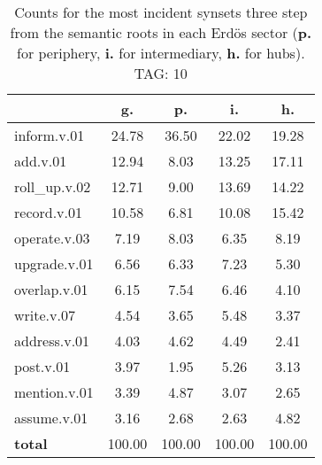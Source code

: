 \begin{table}[h!]
\begin{center}
\begin{tabular}{| l | c | c | c | c |}\hline
 & g. & p. & i. & h. \\\hline
inform.v.01 & 24.78  & 36.50  & 22.02  & 19.28 \\\hline
add.v.01 & 12.94  & 8.03  & 13.25  & 17.11 \\\hline
roll\_up.v.02 & 12.71  & 9.00  & 13.69  & 14.22 \\\hline
record.v.01 & 10.58  & 6.81  & 10.08  & 15.42 \\\hline
operate.v.03 & 7.19  & 8.03  & 6.35  & 8.19 \\\hline
upgrade.v.01 & 6.56  & 6.33  & 7.23  & 5.30 \\\hline
overlap.v.01 & 6.15  & 7.54  & 6.46  & 4.10 \\\hline
write.v.07 & 4.54  & 3.65  & 5.48  & 3.37 \\\hline
address.v.01 & 4.03  & 4.62  & 4.49  & 2.41 \\\hline
post.v.01 & 3.97  & 1.95  & 5.26  & 3.13 \\\hline
mention.v.01 & 3.39  & 4.87  & 3.07  & 2.65 \\\hline
assume.v.01 & 3.16  & 2.68  & 2.63  & 4.82 \\\hline
{{\bf total}} & 100.00  & 100.00  & 100.00  & 100.00 \\\hline
\end{tabular}
\caption{Counts for the most incident synsets three step from the semantic roots in each Erd\"os sector ({\bf p.} for periphery, {\bf i.} for intermediary, {\bf h.} for hubs). TAG: 10}
\end{center}
\end{table}